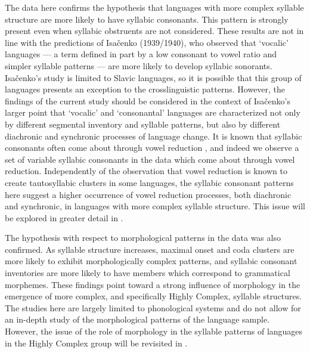   The data here confirms the hypothesis that languages with more complex syllable structure are more likely to have syllabic consonants. This pattern is strongly present even when syllabic obstruents are not considered. These results are not in line with the predictions of Isačenko (1939/1940), who observed that ‘vocalic’ languages — a term defined in part by a low consonant to vowel ratio and simpler syllable patterns — are more likely to develop syllabic sonorants. Isačenko’s study is limited to Slavic languages, so it is possible that this group of languages presents an exception to the crosslinguistic patterns. However, the findings of the current study should be considered in the context of Isačenko’s larger point that ‘vocalic’ and ‘consonantal’ languages are characterized not only by different segmental inventory and syllable patterns, but also by different diachronic and synchronic processes of language change. It is known that syllabic consonants often come about through vowel reduction \citep{Bell1978a}, and indeed we observe a set of variable syllabic consonants in the data which come about through vowel reduction. Independently of the observation that vowel reduction is known to create tautosyllabic clusters in some languages, the syllabic consonant patterns here suggest a higher occurrence of vowel reduction processes, both diachronic and synchronic, in languages with more complex syllable structure. This issue will be explored in greater detail in .

  The hypothesis with respect to morphological patterns in the data was also confirmed. As syllable structure increases, maximal onset and coda clusters are more likely to exhibit morphologically complex patterns, and syllabic consonant inventories are more likely to have members which correspond to grammatical morphemes. These findings point toward a strong influence of morphology in the emergence of more complex, and specifically Highly Complex, syllable structures. The studies here are largely limited to phonological systems and do not allow for an in-depth study of the morphological patterns of the language sample. However, the issue of the role of morphology in the syllable patterns of languages in the Highly Complex group will be revisited in .

